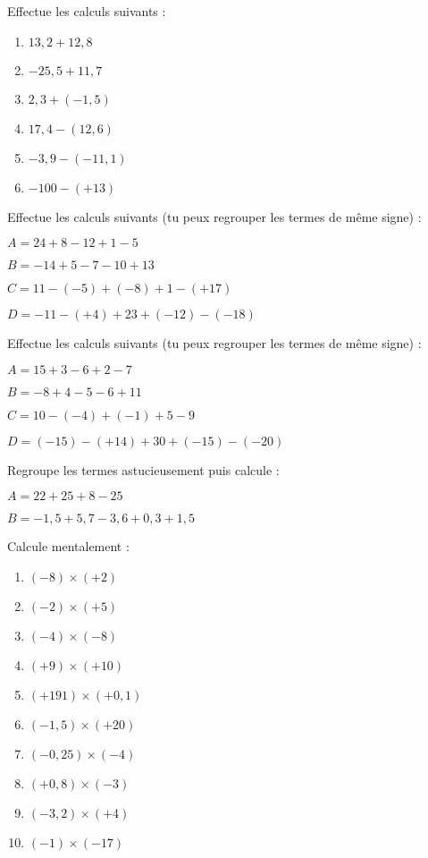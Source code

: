 \begin{exercice}Effectue les calculs suivants :
\begin{enumerate}
\item $13,2 +12,8$
\item $-25,5 +11,7$
\item $2,3 +(-1,5)$
\item $17,4 - (12,6)$
\item $-3,9 - (-11,1)$
\item $-100 - (+13)$
\end{enumerate}
\end{exercice}


\columnbreak
\begin{exercice}Effectue les calculs suivants (tu peux  regrouper les termes de même signe) :

$A = 24 +8 -12 +1 -5$

$B = -14 +5 -7 -10 +13$

$C = 11 -(-5) +(-8) +1 -(+17)$

$D = -11 -(+4) +23 +(-12) -(-18)$
\end{exercice}


\begin{exercice}Effectue les calculs suivants (tu peux  regrouper les termes de même signe) :

$A = 15 +3 -6 +2 -7 $

$B = -8 +4 -5 -6 +11$

$C = 10 -(-4) +(-1) +5 -9$

$D = (-15) -(+14) +30 +(-15) -(-20)$
\end{exercice}


\begin{exercice}Regroupe les termes astucieusement puis calcule :

$A = 22 +25 +8 -25$

$B = -1,5 +5,7 -3,6 +0,3 +1,5$
\end{exercice} 






\begin{exercice}Calcule mentalement :
\begin{enumerate} 
\item $(-8) \times (+2)$
\item $(-2) \times (+5)$
\item $(-4) \times (-8)$
\item $(+9) \times (+10)$
\item $(+191) \times (+0,1)$ 
\item $(-1,5) \times (+20)$
\item $(-0,25) \times (-4)$
\item $(+0,8) \times (-3)$
\item $(-3,2) \times (+4)$
\item $(-1) \times (-17)$
\end{enumerate}
\end{exercice}



